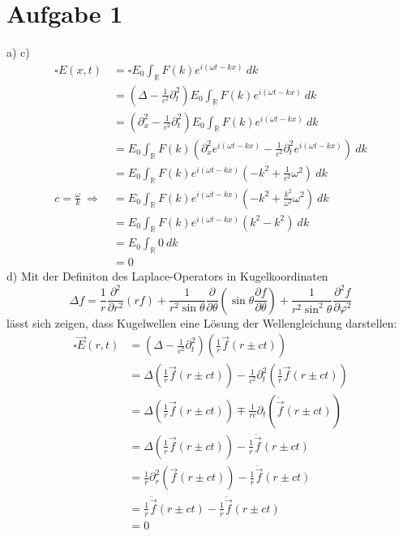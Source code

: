 \documentclass[11pt a4paper]{article}
\newcommand{\delt}{\partial_t}
\newcommand{\del}{\partial}
\begin{document}
\thispagestyle{fancy}

\section*{Aufgabe 1}
a) \newline
c) 
\begin{align*}
	\square E(x,t)
	&= \square E_0 \int_{\mathbb R} F(k) e^{i(\omega t - kx)} \ dk \\
	&= \left(\Delta - \frac{1}{c^2} \delt^2 \right) E_0 \int_{\mathbb R} F(k) e^{i(\omega t - kx)} \ dk \\
	&= \left(\del_x^2 - \frac{1}{c^2} \delt^2 \right) E_0 \int_{\mathbb R} F(k) e^{i(\omega t - kx)} \ dk \\
	&= E_0 \int_{\mathbb R} F(k) \left( 
		\del_x^2 e^{i(\omega t - kx)} - \frac{1}{c^2} \delt^2 e^{i(\omega t - kx)} \right) \ dk \\
	&= E_0 \int_{\mathbb R} F(k) e^{i(\omega t - kx)} \left( 
		-k^2 + \frac{1}{c^2} \omega^2 \right) \ dk \\
	c = \frac{\omega}{k} \ \Rightarrow \
	&= E_0 \int_{\mathbb R} F(k) e^{i(\omega t - kx)} \left( 
		-k^2 + \frac{k^2}{\omega^2} \omega^2 \right) \ dk \\
	&= E_0 \int_{\mathbb R} F(k) e^{i(\omega t - kx)} (k^2 - k^2) \ dk \\
	&= E_0 \int_{\mathbb R} 0 \ dk \\
	&= 0
\end{align*}
d) Mit der Definiton des Laplace-Operators in Kugelkoordinaten
\[ \Delta f =  \frac{1}{r} \frac{\partial^2}{\partial r^2} (rf) + \frac{1}{r^2 \sin \theta} \frac{\partial}{\partial \theta} \left(\sin \theta \frac{\partial f}{\partial \theta} \right) + \frac{1}{r^2 \sin^2 \theta} \frac{\partial^2 f}{\partial \varphi^2} \]
lässt sich zeigen, dass Kugelwellen eine Lösung der Wellengleichung darstellen:
\begin{align*}
	\square \vec E(r,t)
	&= \left(\Delta - \frac{1}{c^2} \delt^2 \right) \left( \frac 1r \vec f(r \pm ct) \right) \\
	&= \Delta  \left( \frac 1r \vec f(r \pm ct) \right) 
	- \frac{1}{c^2} \delt^2 \left( \frac 1r \vec f(r \pm ct) \right) \\
	&= \Delta  \left( \frac 1r \vec f(r \pm ct) \right) 
	\mp \frac{1}{rc} \delt \left( \dot{\vec f}(r \pm ct) \right) \\
	&= \Delta  \left( \frac 1r \vec f(r \pm ct) \right) 
	- \frac{1}{r} \ddot{\vec f}(r \pm ct) \\
	&= \frac{1}{r} \del_r^2 \left(\vec f(r \pm ct) \right) 
	- \frac{1}{r} \ddot{\vec f}(r \pm ct) \\
	&= \frac{1}{r} \ddot{\vec f}(r \pm ct)
	- \frac{1}{r} \ddot{\vec f}(r \pm ct) \\
	&= 0
\end{align*}
\end{document}
